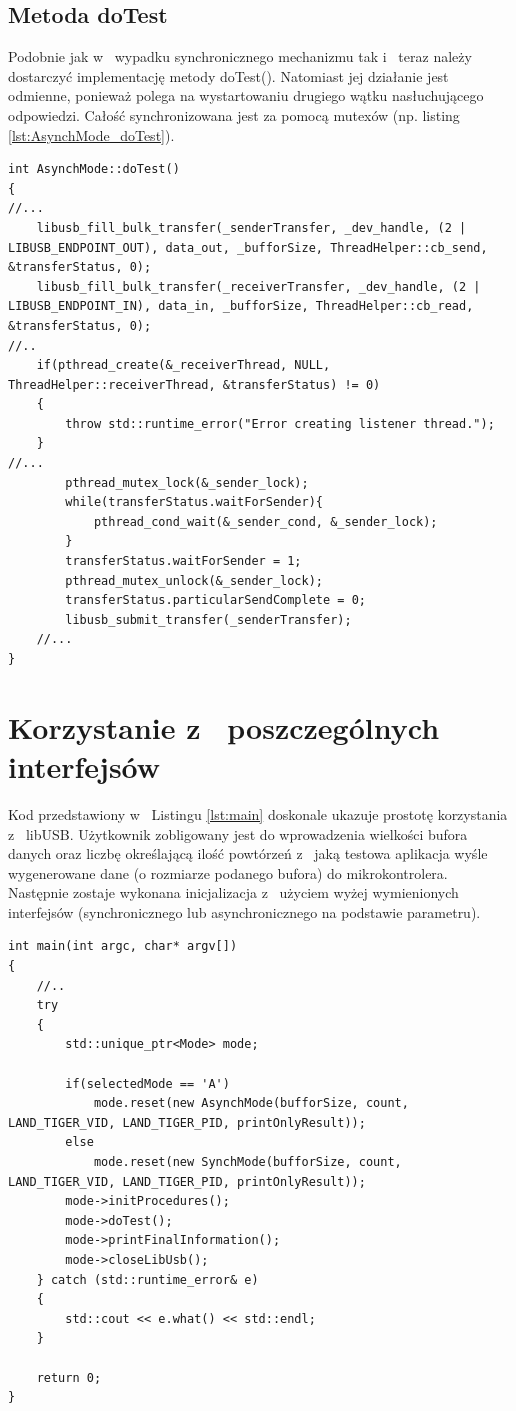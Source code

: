 \documentclass{BscUS}
\begin{document}
\subsection{Metoda doTest}
Podobnie jak w~ wypadku synchronicznego mechanizmu tak i~ teraz należy dostarczyć implementację metody doTest(). Natomiast jej działanie jest odmienne, ponieważ polega na wystartowaniu drugiego wątku nasłuchującego odpowiedzi. Całość synchronizowana jest za pomocą mutexów (np. listing \ref{lst:AsynchMode_doTest}).
\begin{lstlisting}[caption={Metoda AsynchMode::doTest().},label={lst:AsynchMode_doTest}]
int AsynchMode::doTest()
{
//...
	libusb_fill_bulk_transfer(_senderTransfer, _dev_handle, (2 | LIBUSB_ENDPOINT_OUT), data_out, _bufforSize, ThreadHelper::cb_send, &transferStatus, 0);
	libusb_fill_bulk_transfer(_receiverTransfer, _dev_handle, (2 | LIBUSB_ENDPOINT_IN), data_in, _bufforSize, ThreadHelper::cb_read, &transferStatus, 0);
//..
	if(pthread_create(&_receiverThread, NULL, ThreadHelper::receiverThread, &transferStatus) != 0)
	{
		throw std::runtime_error("Error creating listener thread.");
	}
//... 
		pthread_mutex_lock(&_sender_lock);
		while(transferStatus.waitForSender){
			pthread_cond_wait(&_sender_cond, &_sender_lock);
		}
		transferStatus.waitForSender = 1;
		pthread_mutex_unlock(&_sender_lock);
		transferStatus.particularSendComplete = 0;
		libusb_submit_transfer(_senderTransfer);
	//...
}

\end{lstlisting}

\section{Korzystanie z~ poszczególnych interfejsów}
Kod przedstawiony w~ Listingu \ref{lst:main} doskonale ukazuje prostotę korzystania z~ libUSB. Użytkownik zobligowany jest do wprowadzenia wielkości bufora danych oraz liczbę określającą ilość powtórzeń z~ jaką testowa aplikacja wyśle wygenerowane dane (o rozmiarze podanego bufora) do mikrokontrolera. Następnie zostaje wykonana inicjalizacja z~ użyciem wyżej wymienionych interfejsów (synchronicznego lub asynchronicznego na podstawie parametru).
\begin{lstlisting}[caption={Przykład użycia interfejsu synchronicznego lub asynchronicznego w~ zależności od parametryzacji.},label={lst:main}]
int main(int argc, char* argv[])
{
	//..
	try 
	{
		std::unique_ptr<Mode> mode;

		if(selectedMode == 'A')
			mode.reset(new AsynchMode(bufforSize, count, LAND_TIGER_VID, LAND_TIGER_PID, printOnlyResult));
		else 
			mode.reset(new SynchMode(bufforSize, count, LAND_TIGER_VID, LAND_TIGER_PID, printOnlyResult));
		mode->initProcedures();
		mode->doTest();
		mode->printFinalInformation();
		mode->closeLibUsb();
	} catch (std::runtime_error& e)
	{
		std::cout << e.what() << std::endl;
	}

	return 0;
}

\end{lstlisting}
\end{document}
